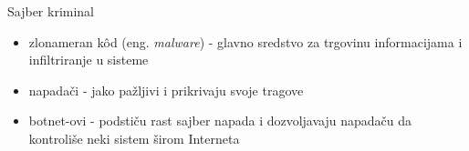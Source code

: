 \begin{frame}{Sajber kriminal}

	\begin{itemize}
		
		\item zlonameran k\^{o}d (eng. \textit{malware}) - glavno sredstvo za trgovinu informacijama i infiltriranje u sisteme
		\item napadači - jako pažljivi i prikrivaju svoje tragove
		\item botnet-ovi - podstiču rast sajber napada i dozvoljavaju napadaču da kontroliše neki sistem širom Interneta
		
	\end{itemize}

\end{frame}
